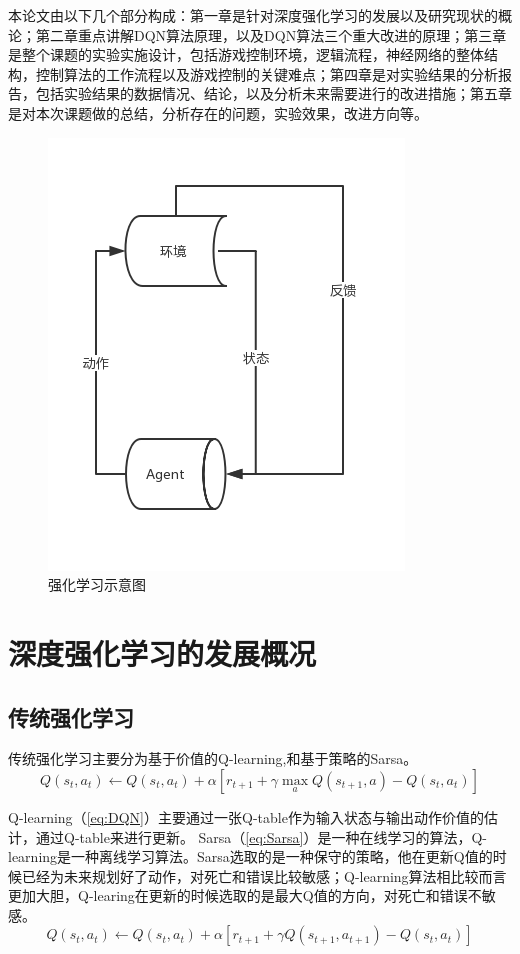 本论文由以下几个部分构成：第一章是针对深度强化学习的发展以及研究现状的概论；第二章重点讲解DQN算法原理，以及DQN算法三个重大改进的原理；第三章是整个课题的实验实施设计，包括游戏控制环境，逻辑流程，神经网络的整体结构，控制算法的工作流程以及游戏控制的关键难点；第四章是对实验结果的分析报告，包括实验结果的数据情况、结论，以及分析未来需要进行的改进措施；第五章是对本次课题做的总结，分析存在的问题，实验效果，改进方向等。
\begin{figure}
  \centering
  \includegraphics[scale=0.5]{static/RL.png}
  \caption{强化学习示意图}
\end{figure}
\cleardoublepage

\section{深度强化学习的发展概况
}
\subsection{传统强化学习}
传统强化学习主要分为基于价值的Q-learning\cite{Mnih2013Playing},和基于策略的Sarsa。\begin{equation}\label{eq:DQN}
  Q\left(s_{t}, a_{t}\right) \leftarrow Q\left(s_{t}, a_{t}\right)+\alpha\left[r_{t+1}+\gamma \max _{a} Q\left(s_{t+1}, a\right)-Q\left(s_{t}, a_{t}\right)\right]  
\end{equation}

Q-learning（\ref{eq:DQN}）主要通过一张Q-table作为输入状态与输出动作价值的估计，通过Q-table来进行更新。
Sarsa（\ref{eq:Sarsa}）是一种在线学习的算法，Q-learning是一种离线学习算法。Sarsa选取的是一种保守的策略，他在更新Q值的时候已经为未来规划好了动作，对死亡和错误比较敏感；Q-learning算法相比较而言更加大胆，Q-learing在更新的时候选取的是最大Q值的方向，对死亡和错误不敏感。
\begin{equation}\label{eq:Sarsa}
  Q\left(s_{t}, a_{t}\right) \leftarrow Q\left(s_{t}, a_{t}\right)+\alpha\left[r_{t+1}+\gamma Q\left(s_{t+1}, a_{t+1}\right)-Q\left(s_{t}, a_{t}\right)\right]
\end{equation}

